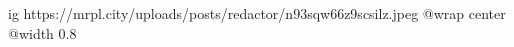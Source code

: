  
 
 
 
 

\ifcmt
  ig https://mrpl.city/uploads/posts/redactor/n93sqw66z9scsilz.jpeg
  @wrap center
  @width 0.8
\fi
